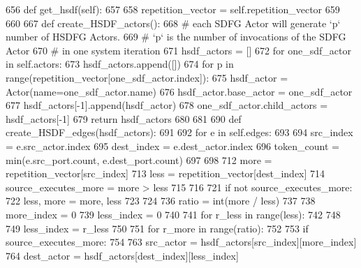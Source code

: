 \begin{DoxyCode}
656     \textcolor{keyword}{def }get\_hsdf(self):
657 
658         repetition\_vector = self.repetition\_vector
659 
660         
667         \textcolor{keyword}{def }create\_HSDF\_actors():
668             \textcolor{comment}{# each SDFG Actor will generate `p` number of HSDFG Actors.}
669             \textcolor{comment}{# `p` is the number of invocations of the SDFG Actor}
670             \textcolor{comment}{# in one system iteration}
671             hsdf\_actors = []
672             \textcolor{keywordflow}{for} one\_sdf\_actor \textcolor{keywordflow}{in} self.actors:
673                 hsdf\_actors.append([])
674                 \textcolor{keywordflow}{for} p \textcolor{keywordflow}{in} range(repetition\_vector[one\_sdf\_actor.index]):
675                     hsdf\_actor = Actor(name=one\_sdf\_actor.name)
676                     hsdf\_actor.base\_actor = one\_sdf\_actor
677                     hsdf\_actors[-1].append(hsdf\_actor)
678                 one\_sdf\_actor.child\_actors = hsdf\_actors[-1]
679             \textcolor{keywordflow}{return} hsdf\_actors
680 
681         
690         \textcolor{keyword}{def }create\_HSDF\_edges(hsdf\_actors):
691 
692             \textcolor{keywordflow}{for} e \textcolor{keywordflow}{in} self.edges:
693 
694                 src\_index = e.src\_actor.index
695                 dest\_index = e.dest\_actor.index
696                 token\_count = min(e.src\_port.count, e.dest\_port.count)
697 
698                 
712                 more = repetition\_vector[src\_index]
713                 less = repetition\_vector[dest\_index]
714                 source\_executes\_more = more > less
715 
716                 
721                 \textcolor{keywordflow}{if} \textcolor{keywordflow}{not} source\_executes\_more:
722                     less, more = more, less
723 
724                 
736                 ratio = int(more / less)
737 
738                 more\_index = 0
739                 less\_index = 0
740 
741                 \textcolor{keywordflow}{for} r\_less \textcolor{keywordflow}{in} range(less):
742                     
748 
749                     less\_index = r\_less
750 
751                     \textcolor{keywordflow}{for} r\_more \textcolor{keywordflow}{in} range(ratio):
752 
753                         \textcolor{keywordflow}{if} source\_executes\_more:
754                             
763                             src\_actor = hsdf\_actors[src\_index][more\_index]
764                             dest\_actor = hsdf\_actors[dest\_index][less\_index]

\end{DoxyCode}
